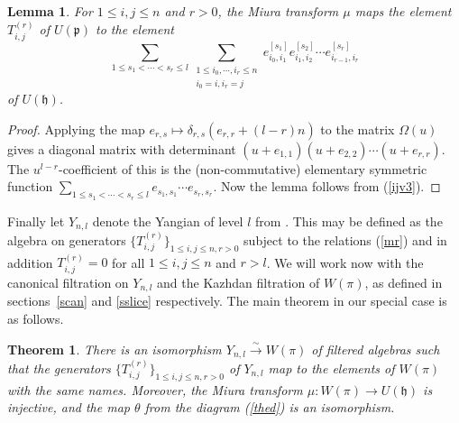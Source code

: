 \documentclass[twoside,12pt,reqno]{amsart}
\newtheorem{Lemma}[Proposition]{Lemma}
\newtheorem{Theorem}[Proposition]{Theorem}
\begin{document}
\begin{Lemma}\label{mim}
For $1 \leq i,j \leq n$ and $r > 0$, the Miura transform 
$\mu$ maps the element
$T_{i,j}^{(r)}$ of $U(\mathfrak{p})$ to the element
\begin{equation}\label{miuraimage}
\sum_{1 \leq s_1 < \cdots < s_r \leq l}
\sum_{\substack{1 \leq i_0,\cdots,i_r \leq n \\ i_0 = i, i_r = j}}
e_{i_0,i_1}^{[s_1]}
e_{i_1,i_2}^{[s_2]}
\cdots
e_{i_{r-1},i_r}^{[s_r]}
\end{equation}
of $U(\mathfrak{h})$.
\end{Lemma}

\begin{proof}
Applying the map $e_{r,s} \mapsto \delta_{r,s} (e_{r,r} + (l-r)n)$
to the matrix $\Omega(u)$ gives a diagonal matrix with
determinant $(u+e_{1,1}) (u+e_{2,2}) \cdots (u+e_{r,r})$.
The $u^{l-r}$-coefficient of this is the (non-commutative)
elementary symmetric function
$\sum_{1 \leq s_1 < \cdots < s_r \leq l} 
e_{s_1,s_1}
\cdots e_{s_r,s_r}$.
Now the lemma follows from (\ref{ijv3}).
\end{proof}


Finally 
let $Y_{n,l}$ denote the Yangian of level $l$ from \cite{Ch}.
This may be defined as the algebra on
generators $\{T_{i,j}^{(r)}\}_{1 \leq i,j \leq n, r >0}$
subject to the relations (\ref{mr}) 
and in addition
$T_{i,j}^{(r)} = 0$
for all $1 \leq i,j \leq n$ and $r > l$.
We will work now with the canonical filtration
on $Y_{n,l}$ and the Kazhdan filtration of 
$W(\pi)$, as defined in sections~\ref{scan}
and \ref{sslice} respectively.
The main theorem in our special case is as follows.

\begin{Theorem}
There is an isomorphism $Y_{n,l} \stackrel{\sim}{\rightarrow}
W(\pi)$ of filtered algebras such that the generators 
$\{T_{i,j}^{(r)}\}_{1 \leq i,j \leq n, r > 0}$
of $Y_{n,l}$ map to the elements of $W(\pi)$ with the same names.
Moreover, the Miura transform
$\mu:W(\pi) \rightarrow U(\mathfrak{h})$ is injective, and the map
$\theta$ from the diagram (\ref{thed})
is an isomorphism.
\end{Theorem}
\end{document}
